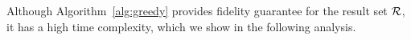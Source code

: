 %

Although Algorithm~\ref{alg:greedy} provides fidelity guarantee for the result set $\mathcal{R}$, it has a high time complexity, which we show in the following analysis.  

 




